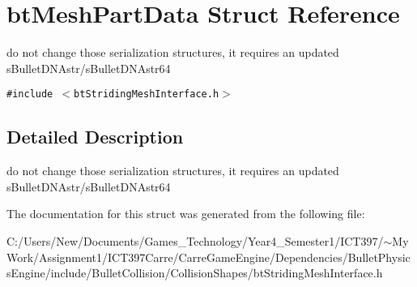 \hypertarget{structbt_mesh_part_data}{
\section{btMeshPartData Struct Reference}
\label{structbt_mesh_part_data}
}
do not change those serialization structures, it requires an updated sBulletDNAstr/sBulletDNAstr64  


{\tt \#include $<$btStridingMeshInterface.h$>$}



\subsection{Detailed Description}
do not change those serialization structures, it requires an updated sBulletDNAstr/sBulletDNAstr64 

The documentation for this struct was generated from the following file:\begin{CompactItemize}
\item 
C:/Users/New/Documents/Games\_\-Technology/Year4\_\-Semester1/ICT397/$\sim$My Work/Assignment1/ICT397Carre/CarreGameEngine/Dependencies/BulletPhysicsEngine/include/BulletCollision/CollisionShapes/btStridingMeshInterface.h\end{CompactItemize}
